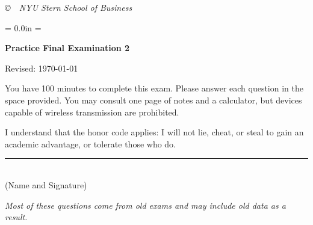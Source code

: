 \documentclass[letterpaper,12pt]{exam}
\def\HeadName{Practice Final Examination 1}
\begin{document}
\vfill \centerline{\it \copyright \ \number\year \
NYU Stern School of Business}



\newpage
\def\HeadName{Practice Final Examination 2}
\parindent = 0.0in
\parskip = \bigskipamount
\setcounter{page}{1} \thispagestyle{empty}
\Head

\centerline{\large \bf \HeadName}%
\centerline{Revised:  \today}

\bigskip
You have 100 minutes to complete this exam.  Please answer each
question in the space provided. You may consult one page of notes
and a calculator, but devices capable of wireless transmission are
prohibited.

I understand that the honor code applies: I will not lie, cheat,
or steal to gain an academic advantage, or tolerate those who do.

\begin{flushright}
\rule{4in}{0.5pt} \\ (Name and Signature)
\end{flushright}

{\it Most of these questions come from old exams and may include old data as a result. }
\end{document}
